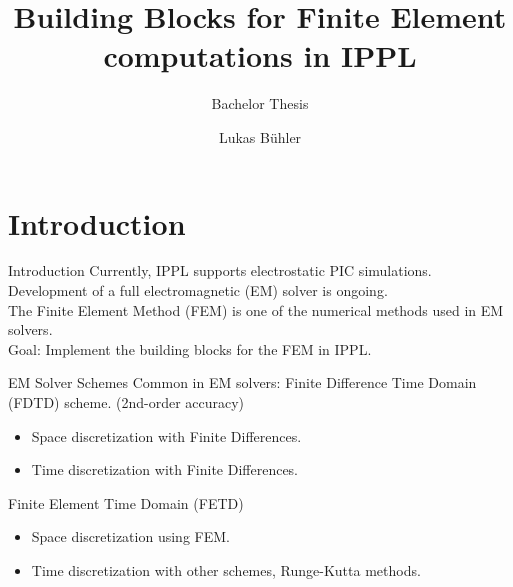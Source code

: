 \documentclass[xcolor=pdftex,table,10pt,yellow,mathserif]{beamer}
\title{Building Blocks for Finite Element computations in IPPL}
\subtitle{Bachelor Thesis}
\author{Lukas Bühler}
\date{\displaydate{presdate}}
\begin{document}
\frame{
    \maketitle
}
%
\frame{
    \tableofcontents
}


\section{Introduction}

\begin{frame}{Introduction}
    Currently, IPPL supports electrostatic PIC simulations.\\

    Development of a full electromagnetic (EM) solver is ongoing.\\

    The Finite Element Method (FEM) is one of the numerical methods used in EM solvers.\\

    Goal: Implement the building blocks for the FEM in IPPL.
\end{frame}

\begin{frame}[t]{EM Solver Schemes}
    Common in EM solvers: Finite Difference Time Domain (FDTD) scheme. (2nd-order accuracy)
    \begin{itemize}
        \item Space discretization with Finite Differences.
        \item Time discretization with Finite Differences.
    \end{itemize}
    \vspace*{0.5cm}
    \pause

    Finite Element Time Domain (FETD)
    \begin{itemize}
        \item Space discretization using FEM.
        \item Time discretization with other schemes, Runge-Kutta methods.
    \end{itemize}
    \vspace*{0.5cm}
\end{frame}
\end{document}
